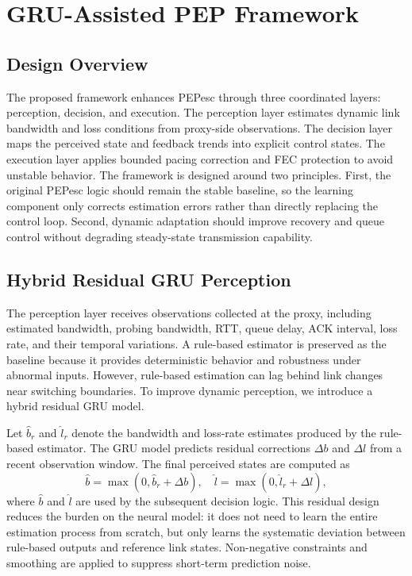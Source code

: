 \section{GRU-Assisted PEP Framework}
\label{sec:framework}

\subsection{Design Overview}
The proposed framework enhances PEPesc through three coordinated layers: perception, decision, and execution. The perception layer estimates dynamic link bandwidth and loss conditions from proxy-side observations. The decision layer maps the perceived state and feedback trends into explicit control states. The execution layer applies bounded pacing correction and FEC protection to avoid unstable behavior. The framework is designed around two principles. First, the original PEPesc logic should remain the stable baseline, so the learning component only corrects estimation errors rather than directly replacing the control loop. Second, dynamic adaptation should improve recovery and queue control without degrading steady-state transmission capability.

\subsection{Hybrid Residual GRU Perception}
The perception layer receives observations collected at the proxy, including estimated bandwidth, probing bandwidth, RTT, queue delay, ACK interval, loss rate, and their temporal variations. A rule-based estimator is preserved as the baseline because it provides deterministic behavior and robustness under abnormal inputs. However, rule-based estimation can lag behind link changes near switching boundaries. To improve dynamic perception, we introduce a hybrid residual GRU model.

Let $\hat{b}_{r}$ and $\hat{l}_{r}$ denote the bandwidth and loss-rate estimates produced by the rule-based estimator. The GRU model predicts residual corrections $\Delta b$ and $\Delta l$ from a recent observation window. The final perceived states are computed as
\begin{equation}
\hat{b}=\max(0,\hat{b}_{r}+\Delta b), \quad
\hat{l}=\max(0,\hat{l}_{r}+\Delta l),
\label{eq:residual}
\end{equation}
where $\hat{b}$ and $\hat{l}$ are used by the subsequent decision logic. This residual design reduces the burden on the neural model: it does not need to learn the entire estimation process from scratch, but only learns the systematic deviation between rule-based outputs and reference link states. Non-negative constraints and smoothing are applied to suppress short-term prediction noise.

